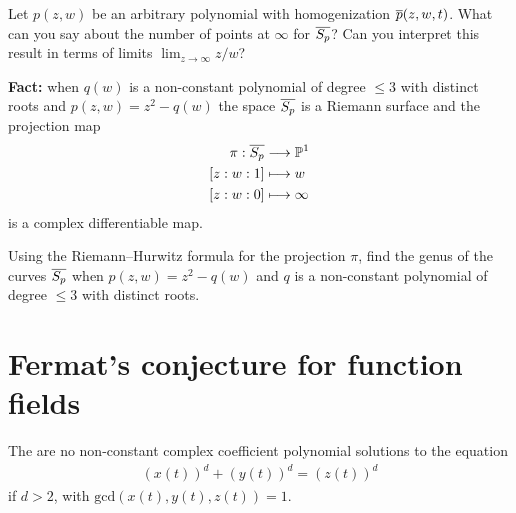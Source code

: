 \documentclass{article}
\begin{document}
\begin{qbox}
  Let $p(z,w)$ be an arbitrary polynomial with homogenization $\overline{p}(z,w,t)$.
  What can you say about the number of points at $\infty$ for $\overline{S_p}$?
  Can you interpret this result in terms of limits $\lim_{z \rightarrow \infty} z/w$?
\end{qbox}

\textbf{Fact:} when $q(w)$ is a non-constant polynomial of degree $\le 3$ with distinct roots and $p(z,w) = z^2 - q(w)$ the space $\overline{S_p}$ is a Riemann surface and the projection map
\begin{align*}
    \pi: \overline{S_p} &\longrightarrow \mathbb{P}^1 \\
    [z:w:1] &\longmapsto w \\
    [z:w:0]  &\longmapsto \infty
\end{align*}
is a complex differentiable map.

\begin{qbox}
  Using the Riemann--Hurwitz formula for the projection $\pi$, find the genus of the curves $\overline{S_p}$ when $p(z,w) = z^2 - q(w)$ and $q$ is a non-constant polynomial of degree $\le 3$ with distinct roots.
\end{qbox}












\section{Fermat's conjecture for function fields}

\begin{theorem}
  The are no non-constant complex coefficient polynomial solutions to the equation
  \begin{align*}
    (x(t))^d + (y(t))^d  = (z(t))^d
  \end{align*}
  if $d > 2$, with $\mathrm{gcd}(x(t), y(t), z(t)) = 1$.
\end{theorem}
\end{document}
